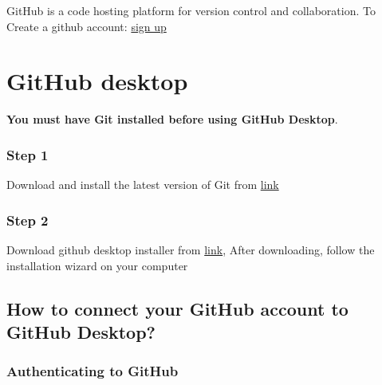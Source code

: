 \documentclass[
  letterpaper,
  DIV=11,
  numbers=noendperiod]{scrreprt}
\begin{document}
GitHub is a code hosting platform for version control and collaboration.
To Create a github account: \href{https://github.com/signup}{sign up}

\hypertarget{github-desktop}{%
\section{GitHub desktop}\label{github-desktop}}

\begin{tcolorbox}[enhanced jigsaw, leftrule=.75mm, breakable, coltitle=black, opacitybacktitle=0.6, colframe=quarto-callout-important-color-frame, bottomrule=.15mm, toptitle=1mm, left=2mm, opacityback=0, colbacktitle=quarto-callout-important-color!10!white, rightrule=.15mm, bottomtitle=1mm, arc=.35mm, titlerule=0mm, title=\textcolor{quarto-callout-important-color}{\faExclamation}\hspace{0.5em}{Important}, toprule=.15mm, colback=white]
\textbf{You must have Git installed before using GitHub Desktop}.
\end{tcolorbox}

\hypertarget{step-1-3}{%
\subsubsection{Step 1}\label{step-1-3}}

Download and install the latest version of Git from
\href{https://git-scm.com/downloads}{link}

\hypertarget{step-2-3}{%
\subsubsection{Step 2}\label{step-2-3}}

Download github desktop installer from
\href{https://desktop.github.com/}{link}, After downloading, follow the
installation wizard on your computer

\hypertarget{how-to-connect-your-github-account-to-github-desktop}{%
\subsection{How to connect your GitHub account to GitHub
Desktop?}\label{how-to-connect-your-github-account-to-github-desktop}}

\hypertarget{authenticating-to-github}{%
\subsubsection{Authenticating to
GitHub}\label{authenticating-to-github}}
\end{document}
